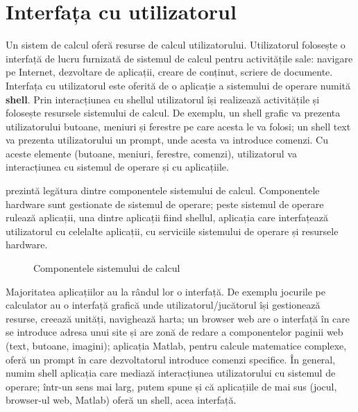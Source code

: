 
\chapter{Interfața cu utilizatorul}
\label{ch:ui}

Un sistem de calcul oferă resurse de calcul utilizatorului.
Utilizatorul folosește o interfață de lucru furnizată de sistemul de calcul pentru activitățile sale: navigare pe Internet, dezvoltare de aplicații, creare de conținut, scriere de documente.
Interfața cu utilizatorul este oferită de o aplicație a sistemului de operare numită \textbf{shell}.
Prin interacțiunea cu shellul utilizatorul își realizează activitățile și folosește resursele sistemului de calcul.
De exemplu, un shell grafic va prezenta utilizatorului butoane, meniuri și ferestre pe care acesta le va folosi;
un shell text va prezenta utilizatorului un prompt, unde acesta va introduce comenzi.
Cu aceste elemente (butoane, meniuri, ferestre, comenzi), utilizatorul va interacțiunea cu sistemul de operare și cu aplicațiile.

 prezintă legătura dintre componentele sistemului de calcul.
Componentele hardware sunt gestionate de sistemul de operare;
peste sistemul de operare rulează aplicații, una dintre aplicații fiind shellul, aplicația care interfațează utilizatorul cu celelalte aplicații, cu serviciile sistemului de operare și resursele hardware.

\begin{figure}[htbp]
  \centering
  \def\svgwidth{\columnwidth}
  
  \caption{Componentele sistemului de calcul}
  \label{fig:ui:system-components}
\end{figure}

Majoritatea aplicațiilor au la rândul lor o interfață.
De exemplu jocurile pe calculator au o interfață grafică unde utilizatorul/jucătorul își gestionează resurse, creează unități, navighează harta;
un browser web are o interfață în care se introduce adresa unui site și are zonă de redare a componentelor paginii web (text, butoane, imagini);
aplicația Matlab, pentru calcule matematice complexe, oferă un prompt în care dezvoltatorul introduce comenzi specifice.
În general, numim shell aplicația care mediază interacțiunea utilizatorului cu sistemul de operare;
într-un sens mai larg, putem spune și că aplicațiile de mai sus (jocul, browser-ul web, Matlab) oferă un shell, acea interfață.

